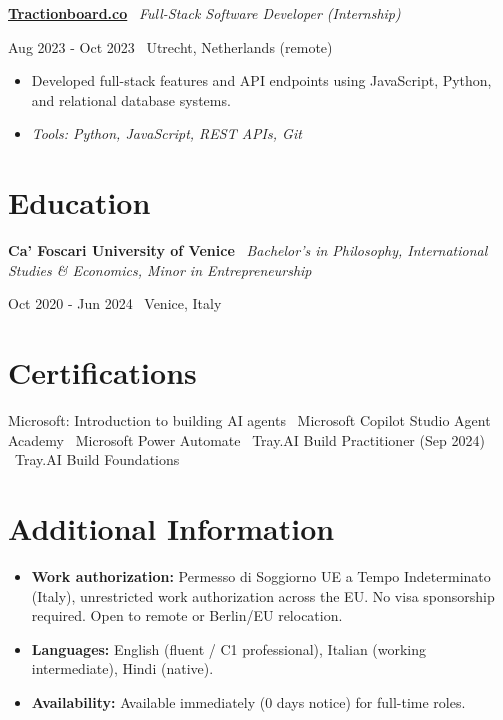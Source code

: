 \documentclass[a4paper,10pt]{article}
\newcommand{\role}[4]{%
  \vspace{2pt}\noindent
  \begin{minipage}[t]{0.70\textwidth}\raggedright\textbf{#1} \textbullet\ \textit{#3}\end{minipage}%
  \hfill
  \begin{minipage}[t]{0.28\textwidth}\raggedleft\footnotesize\color{gray}#2 \textbullet\ #4\end{minipage}%
  \vspace{1pt}%
}
\begin{document}
\role{\href{https://tractionboard.co}{Tractionboard.co}}{Aug 2023 - Oct 2023}{Full-Stack Software Developer (Internship)}{Utrecht, Netherlands (remote)}
\begin{itemize}
  \item Developed full-stack features and API endpoints using JavaScript, Python, and relational database systems.
  \item \textit{Tools: Python, JavaScript, REST APIs, Git}
\end{itemize}

\section{Education}
\role{Ca' Foscari University of Venice}{Oct 2020 - Jun 2024}{Bachelor's in Philosophy, International Studies \& Economics, Minor in Entrepreneurship}{Venice, Italy}

\section{Certifications}
Microsoft: Introduction to building AI agents \textbullet\ Microsoft Copilot Studio Agent Academy \textbullet\ Microsoft Power Automate \textbullet\ Tray.AI Build Practitioner (Sep 2024) \textbullet\ Tray.AI Build Foundations

\section{Additional Information}
\begin{itemize}
  \item \textbf{Work authorization:} Permesso di Soggiorno UE a Tempo Indeterminato (Italy), unrestricted work authorization across the EU. No visa sponsorship required. Open to remote or Berlin/EU relocation.
  \item \textbf{Languages:} English (fluent / C1 professional), Italian (working intermediate), Hindi (native).
  \item \textbf{Availability:} Available immediately (0 days notice) for full-time roles.
\end{itemize}

\end{document}
